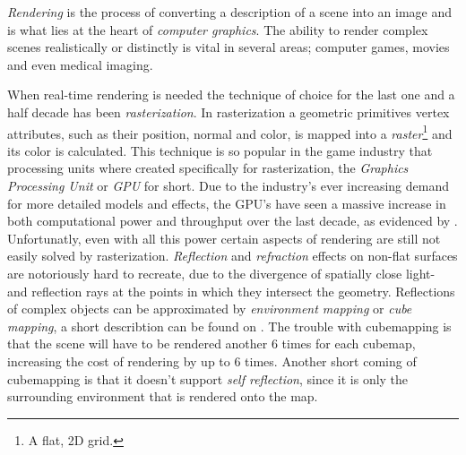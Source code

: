 





\textit{Rendering} is the process of converting a description of a
scene into an image and is what lies at the heart of \textit{computer
  graphics}. The ability to render complex scenes realistically or
distinctly is vital in several areas; computer games, movies and even
medical imaging.



When real-time rendering is needed the technique of choice for the
last one and a half decade has been \textit{rasterization}. In
rasterization a geometric primitives vertex attributes, such as their
position, normal and color, is mapped into a
\textit{raster}\footnote{A flat, 2D grid.} and its color is
calculated. This technique is so popular in the game industry that
processing units where created specifically for rasterization, the
\textit{Graphics Processing Unit} or \textit{GPU} for short. Due to
the industry's ever increasing demand for more detailed models and
effects, the GPU's have seen a massive increase in both computational
power and throughput over the last decade, as evidenced by
. Unfortunatly, even with all this power certain
aspects of rendering are still not easily solved by
rasterization. \textit{Reflection} and \textit{refraction} effects on
non-flat surfaces are notoriously hard to recreate, due to the
divergence of spatially close light- and reflection rays at the points
in which they intersect the geometry. Reflections of complex objects
can be approximated by \textit{environment mapping} or \textit{cube
  mapping}, a short describtion can be found on
. The trouble with cubemapping is that the scene
will have to be rendered another 6 times for each cubemap, increasing
the cost of rendering by up to 6 times. Another short coming of
cubemapping is that it doesn't support \textit{self reflection}, since
it is only the surrounding environment that is rendered onto the map.

